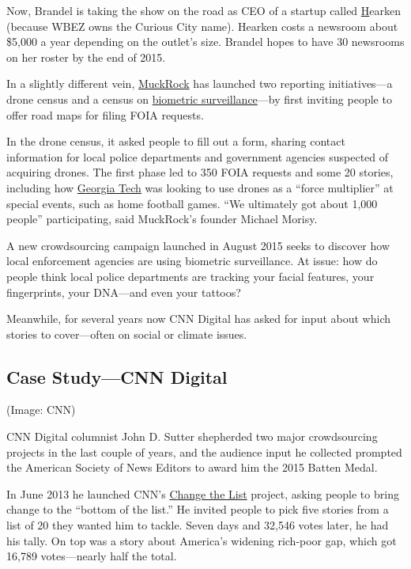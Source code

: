 \begin{itemize}
\begin{itemize}
\begin{enumerate}
Now, Brandel is taking the show on the road as CEO of a startup called \href{http://www.wearehearken.com/}Hearken\autocite{Hearken} (because WBEZ owns the Curious City name). Hearken costs a newsroom about \$5,000 a year depending on the outlet’s size. Brandel hopes to have 30 newsrooms on her roster by the end of 2015.

In a slightly different vein, \href{https://www.muckrock.com/}{MuckRock} has launched two reporting initiatives---a drone census and a census on \href{https://www.muckrock.com/news/archives/2015/aug/04/street-level-surveillance-who-using-mobile-biometr/}{biometric surveillance}---by first inviting people to offer road maps for filing FOIA requests.\autocite{Morisy}

In the drone census, it asked people to fill out a form, sharing contact information for local police departments and government agencies suspected of acquiring drones. The first phase led to 350 FOIA requests and some 20 stories, including how \href{https://www.muckrock.com/news/archives/2013/jan/24/georgia-tech-police-wanted-fly-surveillance-drone-/}{Georgia Tech}\autocite{Drone}
was looking to use drones as a ``force multiplier'' at special events, such as home football games. ``We ultimately got about 1,000 people'' participating, said MuckRock’s founder Michael Morisy.\autocite{Morisy}

A new crowdsourcing campaign launched in August 2015 seeks to discover how local enforcement agencies are using biometric surveillance.\autocite{surveillance} At issue: how do people think local police departments are tracking your facial features, your fingerprints, your DNA---and even your tattoos?\autocite{Morisy}

Meanwhile, for several years now CNN Digital has asked for input about which stories to cover---often on social or climate issues.

\subsection{Case Study---CNN Digital} (Image: CNN) 

CNN Digital columnist John D. Sutter shepherded two major crowdsourcing projects in the last couple of years, and the audience input he collected prompted the American Society of News Editors to award him the 2015 Batten Medal.

In June 2013 he launched CNN’s \href{http://www.cnn.com/specials/opinion/change-the-list}{Change the List} project, asking people to bring change to the ``bottom of the list.''\autocite{CNN} He invited people to pick five stories from a list of 20 they wanted him to tackle. Seven days and 32,546 votes later, he had his tally. On top was a story about America’s widening rich-poor gap, which got 16,789 votes---nearly half the total.


\end{enumerate}
\end{itemize}
\end{itemize}
